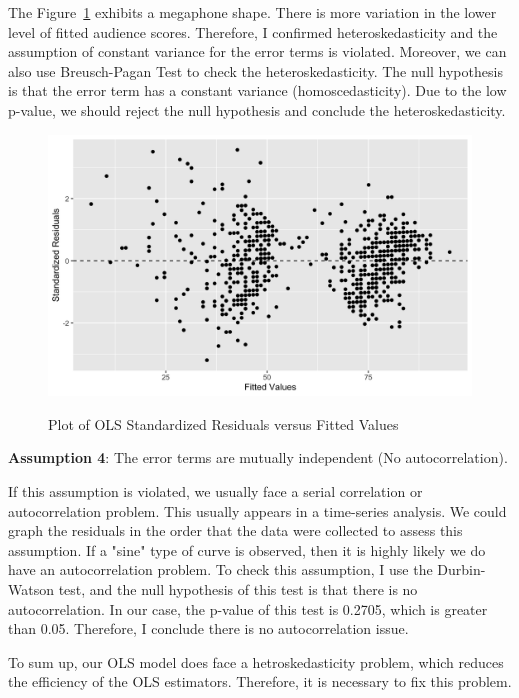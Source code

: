 \documentclass{article}
\begin{document}
The Figure~\ref{fig: 14} exhibits a megaphone shape. There is more variation in the lower level of fitted audience scores. Therefore, I confirmed heteroskedasticity and the assumption of constant variance for the error terms is violated. Moreover, we can also use Breusch-Pagan Test to check the  heteroskedasticity. The null hypothesis is that the error term has a constant variance (homoscedasticity). Due to the low p-value, we should reject the null hypothesis and conclude the heteroskedasticity.

\begin{figure}[htbp]
\begin{center}
\caption{Plot of OLS Standardized Residuals versus Fitted Values}
\includegraphics[scale=0.3]{ols_residuals.png}
\label{fig: 14}
\end{center}
\end{figure}

\textbf{Assumption 4}: The error terms are mutually independent (No autocorrelation).

If this assumption is violated, we usually face a serial correlation or autocorrelation problem. This usually appears in a time-series analysis. We could graph the residuals in the order that the data were collected to assess this assumption. If a "sine" type of curve is observed, then it is highly likely we do have an autocorrelation problem. To check this assumption, I use the Durbin-Watson test, and the null hypothesis of this test is that there is no autocorrelation. In our case, the p-value of this test is 0.2705, which is greater than 0.05. Therefore, I conclude there is no autocorrelation issue.

To sum up, our OLS model does face a hetroskedasticity problem, which reduces the efficiency of the OLS estimators. Therefore, it is necessary to fix this problem.
\end{document}
